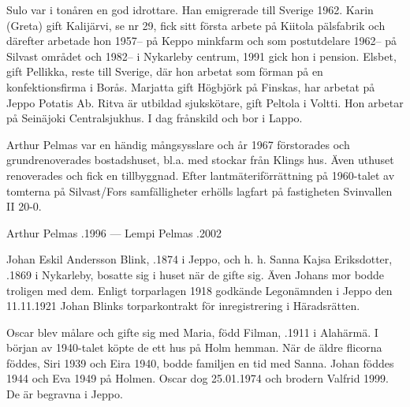 Sulo var i tonåren en god idrottare. Han emigrerade till Sverige 1962. Karin (Greta) gift Kalijärvi, se nr 29, fick sitt första arbete på Kiitola pälsfabrik och därefter arbetade hon 1957-- på Keppo minkfarm och som postutdelare 1962-- på Silvast området och 1982-- i Nykarleby centrum, 1991 gick hon i pension. Elsbet, gift Pellikka, reste till Sverige, där hon arbetat som förman på en konfektionsfirma i Borås. Marjatta gift Högbjörk på Finskas, har arbetat på Jeppo Potatis Ab. Ritva är utbildad sjukskötare, gift Peltola i Voltti. Hon arbetar på Seinäjoki Centralsjukhus. I dag frånskild och bor i Lappo.

Arthur Pelmas var en händig mångsysslare och år 1967 förstorades och grundrenoverades bostadshuset, bl.a. med stockar från Klings hus. Även uthuset renoverades och fick en tillbyggnad. Efter lantmäteriförrättning på 1960-talet av tomterna på Silvast/Fors samfälligheter erhölls lagfart på fastigheten Svinvallen II 20-0.

Arthur Pelmas .1996  ---  Lempi Pelmas .2002


Johan Eskil Andersson Blink, .1874 i Jeppo, och h. h. Sanna Kajsa Eriksdotter, .1869 i Nykarleby, bosatte sig i huset när de gifte sig. Även Johans mor bodde troligen med dem. Enligt torparlagen 1918 godkände Legonämnden i Jeppo den 11.11.1921 Johan Blinks torparkontrakt för inregistrering i Häradsrätten.
\begin{jhchildren}
  \item {}
  \item {}
  \item {}
  \item {}
  \item {}
\end{jhchildren}
Oscar blev målare och gifte sig med Maria, född Filman, .1911 i Alahärmä. I början av 1940-talet köpte de ett hus på Holm hemman. När de äldre flicorna föddes, Siri 1939 och Eira 1940, bodde familjen en tid med Sanna. Johan föddes 1944 och Eva 1949 på Holmen. Oscar dog 25.01.1974 och brodern Valfrid 1999. De är begravna i Jeppo.

